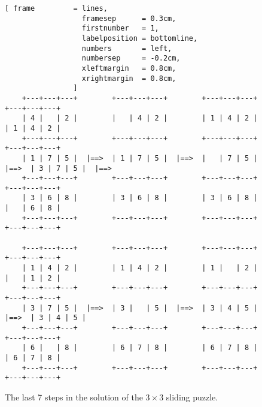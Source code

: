 \begin{figure}[!ht]
\centering
\begin{Verbatim}[ frame         = lines,
                  framesep      = 0.3cm,
                  firstnumber   = 1,
                  labelposition = bottomline,
                  numbers       = left,
                  numbersep     = -0.2cm,
                  xleftmargin   = 0.8cm,
                  xrightmargin  = 0.8cm,
                ]
    +---+---+---+        +---+---+---+        +---+---+---+        +---+---+---+
    | 4 |   | 2 |        |   | 4 | 2 |        | 1 | 4 | 2 |        | 1 | 4 | 2 |
    +---+---+---+        +---+---+---+        +---+---+---+        +---+---+---+
    | 1 | 7 | 5 |  |==>  | 1 | 7 | 5 |  |==>  |   | 7 | 5 |  |==>  | 3 | 7 | 5 |  |==>
    +---+---+---+        +---+---+---+        +---+---+---+        +---+---+---+
    | 3 | 6 | 8 |        | 3 | 6 | 8 |        | 3 | 6 | 8 |        |   | 6 | 8 |
    +---+---+---+        +---+---+---+        +---+---+---+        +---+---+---+

    +---+---+---+        +---+---+---+        +---+---+---+        +---+---+---+
    | 1 | 4 | 2 |        | 1 | 4 | 2 |        | 1 |   | 2 |        |   | 1 | 2 |
    +---+---+---+        +---+---+---+        +---+---+---+        +---+---+---+
    | 3 | 7 | 5 |  |==>  | 3 |   | 5 |  |==>  | 3 | 4 | 5 |  |==>  | 3 | 4 | 5 |
    +---+---+---+        +---+---+---+        +---+---+---+        +---+---+---+
    | 6 |   | 8 |        | 6 | 7 | 8 |        | 6 | 7 | 8 |        | 6 | 7 | 8 |
    +---+---+---+        +---+---+---+        +---+---+---+        +---+---+---+
\end{Verbatim}
\vspace*{-0.3cm}
\caption{The last 7 steps in the solution of the $3 \times 3$ sliding puzzle.}
\label{fig:8-puzzle.solution2}
\end{figure}

